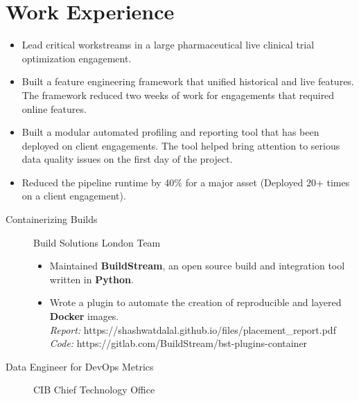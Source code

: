 \documentclass[a4paper]{deedy-resume} %
\begin{document}
\section{Work Experience}
\begin{description}
    \begin{itemize}
        \item Lead critical workstreams in a large pharmaceutical live clinical trial optimization engagement. 
        \item Built a feature engineering framework that unified historical and live features. The framework reduced two weeks of work for engagements that required online features.
        \item Built a modular automated profiling and reporting tool that has been deployed on client engagements. The tool helped bring attention to serious data quality issues on the first day of the project. 
        \item Reduced the pipeline runtime by 40\% for a major asset (Deployed 20+ times on a client engagement).
    \end{itemize}
\end{description}
\begin{description}
    \item[Containerizing Builds] Build Solutions London Team
        \begin{itemize}
            \item Maintained \textbf{BuildStream}, an open source build and integration tool written in \textbf{Python}.
            \item Wrote a plugin to automate the creation of reproducible and layered \textbf{Docker} images.
            \\
            \textit{Report:} https://shashwatdalal.github.io/files/placement\_report.pdf \\
            \textit{Code:} https://gitlab.com/BuildStream/bst-plugins-container
        \end{itemize}
\end{description}
\begin{description}
    \item[Data Engineer for DevOps Metrics] CIB Chief Technology Office
\end{description}
\end{document}
